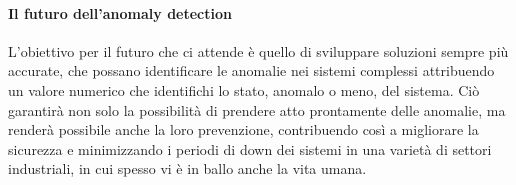         \paragraph{Il futuro dell'anomaly detection} L'obiettivo per il futuro che ci attende è quello di sviluppare 
        soluzioni sempre più accurate, che possano identificare le anomalie nei sistemi complessi attribuendo un valore 
        numerico che identifichi lo stato, anomalo o meno, del sistema. Ciò garantirà non solo la possibilità di prendere atto 
        prontamente delle anomalie, ma renderà possibile anche la loro prevenzione, contribuendo così a migliorare 
        la sicurezza e minimizzando i periodi di down dei sistemi in una varietà di settori industriali, in cui spesso 
        vi è in ballo anche la vita umana.
